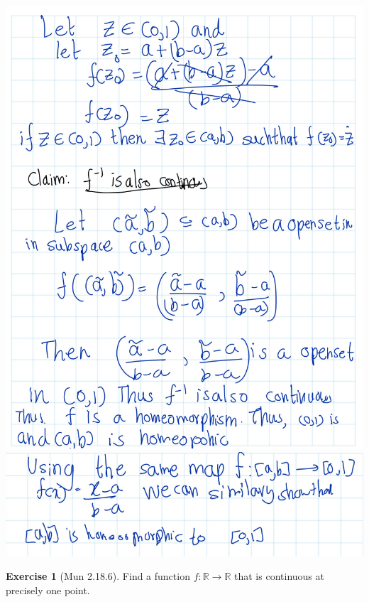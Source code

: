 \documentclass[
]{book}
\theoremstyle{definition}
\theoremstyle{definition}
\theoremstyle{definition}
\newtheorem{exercise}{Exercise}[chapter]
\theoremstyle{definition}
\theoremstyle{remark}
\begin{document}
\includegraphics{figures/Exercises/Ex 2.18/ex-5-3.png}
\includegraphics{figures/Exercises/Ex 2.18/ex-5-4.png}

\begin{exercise}[Mun 2.18.6]
\protect\hypertarget{exr:unnamed-chunk-201}{}\label{exr:unnamed-chunk-201}Find a function \(f : \mathbb{R} \to \mathbb{R}\) that is continuous at precisely one point.
\end{exercise}
\end{document}
